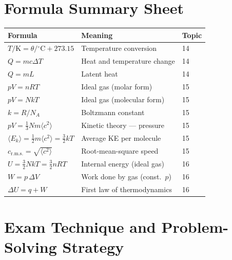 \section{Formula Summary Sheet}

\begin{summarybox}
\renewcommand{\arraystretch}{1.6}
\begin{tabular}{p{6.5cm} p{5.5cm} p{1.8cm}}
\toprule
\textbf{Formula} & \textbf{Meaning} & \textbf{Topic} \\
\midrule
$T/\mathrm{K} = \theta/{}^{\circ}\mathrm{C} + 273.15$
  & Temperature conversion & 14 \\
$Q = mc\Delta T$
  & Heat and temperature change & 14 \\
$Q = mL$
  & Latent heat & 14 \\
$pV = nRT$
  & Ideal gas (molar form) & 15 \\
$pV = NkT$
  & Ideal gas (molecular form) & 15 \\
$k = R/N_A$
  & Boltzmann constant & 15 \\
$pV = \tfrac{1}{3}Nm\langle c^2\rangle$
  & Kinetic theory — pressure & 15 \\
$\langle E_k\rangle = \tfrac{1}{2}m\langle c^2\rangle = \tfrac{3}{2}kT$
  & Average KE per molecule & 15 \\
$c_{\mathrm{r.m.s.}} = \sqrt{\langle c^2\rangle}$
  & Root-mean-square speed & 15 \\
$U = \tfrac{3}{2}NkT = \tfrac{3}{2}nRT$
  & Internal energy (ideal gas) & 16 \\
$W = p\,\Delta V$
  & Work done by gas (const.\ $p$) & 16 \\
$\Delta U = q + W$
  & First law of thermodynamics & 16 \\
\bottomrule
\end{tabular}
\end{summarybox}

\section{Exam Technique and Problem-Solving Strategy}

